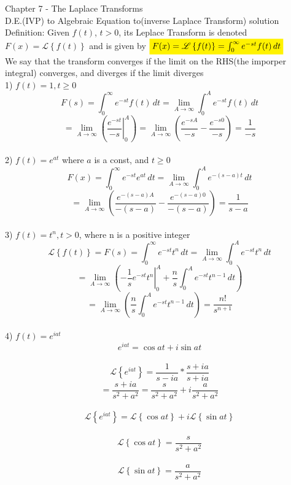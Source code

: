 \documentclass[a4paper, 12pt]{article}
\renewcommand{\L}[1] {\ensuremath{\mathscr{L}\left\{#1\right\}}}
\newcommand{\highlight}[2][yellow]{\mathchoice%
  {\colorbox{#1}{$\displaystyle#2$}}%
  {\colorbox{#1}{$\textstyle#2$}}%
  {\colorbox{#1}{$\scriptstyle#2$}}%
  {\colorbox{#1}{$\scriptscriptstyle#2$}}}%
\begin{document}
    Chapter 7 - The Laplace Transforms\\[10px]
    D.E.(IVP) to Algebraic Equation to(inverse Laplace Transform) solution\\[20px]
    Definition: Given $f(t)$, $t>0$, its Leplace Transform is denoted $F(x) = \L{f(t)}$ and is
    given by $\highlight{F(x) = \L{f(t)} = \int_{0}^{\infty}{e^{-st}f(t)\,dt}}$\\[20px]
    We say that the transform converges if the limit on the RHS(the imporper integral) converges,
    and diverges if the limit diverges\\[20px]
    1) $f(t) = 1, t \ge 0$\\[20px]
    $$F(s) = \int_0^{\infty}{e^{-st}f(t)\,dt} = \lim_{A \to \infty}{\int_0^A{e^{-st}f(t)\,dt}}$$
    $$= \lim_{A \to \infty}{\left(\left.\frac{e^{-st}}{-s}\right|_0^A\right)} = \lim_{A \to \infty}{\left(\frac{e^{-sA}}{-s} - \frac{e^{-s0}}{-s}\right)} = \frac{1}{-s}$$\\[20px]
    
    2) $f(t) = e^{at}$ where $a$ is a const, and $t \ge 0$\\[20px]
    $$F(x) = \int_0^{\infty}{e^{-st}e^{at}\,dt} = \lim_{A \to \infty}{\int_0^{A}{e^{-(s-a)t}\,dt}}$$
    $$ = \lim_{A \to \infty}{\left(\frac{e^{-(s-a)A}}{-(s-a)} - \frac{e^{-(s-a)0}}{-(s-a)}\right)} = \frac{1}{s-a}$$\\[20px]
    
    3) $f(t) = t^n, t > 0$, where n is a positive integer\\[20px]
    $$ \L{f(t)} = F(s) = \int_0^{\infty}{e^{-st}t^n\,dt} = \lim_{A \to \infty}{\int_0^{A}{e^{-st}t^n\,dt}}$$
    $$ = \lim_{A \to \infty}{\left(\left.-\frac{1}{s}e^{-st}t^n\right|_0^A + \frac{n}{s}\int_0^A{e^{-st}t^{n-1}\,dt}\right)} $$
    $$ = \lim_{A \to \infty}{\left(\frac{n}{s}\int_0^{A}{e^{-st}t^{n-1}\,dt}\right)} = \frac{n!}{s^{n+1}}$$\\[20px]
    
    4) $ f(t) = e^{iat} $\\[20px]
    $$ e^{iat} = \cos{at} + i\sin{at}$$\\[20px]
    $$ \L{e^{iat}} = \frac{1}{s-ia} * \frac{s+ia}{s+ia} $$
    $$ = \frac{s+ia}{s^2+a^2} = \frac{s}{s^2+a^2} + i\frac{a}{s^2 + a^2}$$\\[20px]
    $$ \L{e^{iat}} = \L{\cos{at}} + i\L{\sin{at}} $$\\[20px]
    $$ \L{\cos{at}} = \frac{s}{s^2+a^2}$$\\[20px]
    $$ \L{\sin{at}} = \frac{a}{s^2+a^2}$$\\[20px]
    
\end{document}
